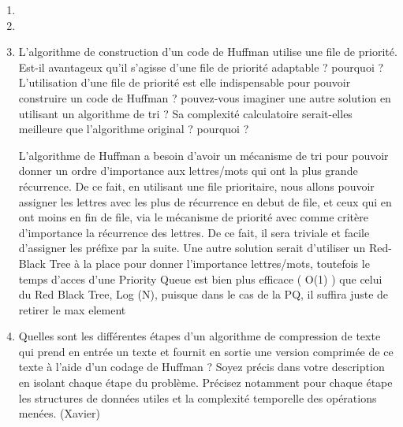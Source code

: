 \documentclass[11pt]{article}
\begin{document}
\begin{enumerate}
\item
\item
\item L'algorithme de construction d'un code de Huffman utilise une file de priorité. Est-il avantageux qu'il s'agisse d'une file de priorité adaptable ? pourquoi ? L'utilisation d'une file de priorité est elle indispensable pour pouvoir construire un code de Huffman ? pouvez-vous imaginer une autre solution en utilisant un algorithme de tri ? Sa complexité calculatoire serait-elles meilleure que l'algorithme original ? pourquoi ?

L’algorithme de Huffman a besoin d’avoir un mécanisme de tri pour pouvoir donner un ordre d’importance aux lettres/mots qui ont la plus grande récurrence. De ce fait, en utilisant une file prioritaire, nous allons pouvoir assigner les lettres avec les plus de récurrence en debut de file, et ceux qui en ont moins en fin de file, via le mécanisme de priorité avec comme critère d’importance la récurrence des lettres. De ce fait, il sera triviale et facile d’assigner les préfixe par la suite. Une autre solution serait d’utiliser un Red-Black Tree à la place pour donner l’importance lettres/mots, toutefois le temps d’acces d’une Priority Queue est bien plus efficace ( O(1) ) que celui du Red Black Tree, Log (N), puisque dans le cas de la PQ, il suffira juste de retirer le max element

\item Quelles sont les différentes étapes d’un algorithme de compression de texte qui
prend en entrée un texte et fournit en sortie une version comprimée de ce texte à
l’aide d’un codage de Huffman ? Soyez précis dans votre description en isolant
chaque étape du problème. Précisez notamment pour chaque étape les structures
de données utiles et la complexité temporelle des opérations menées. (Xavier)\\


\end{enumerate}
\end{document}
